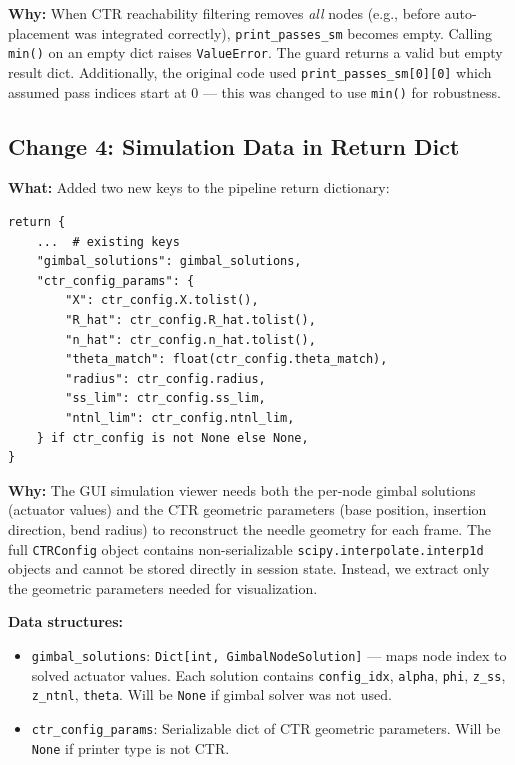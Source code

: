 \documentclass[11pt,a4paper]{article}
\begin{document}
\textbf{Why:} When CTR reachability filtering removes \emph{all} nodes (e.g., before auto-placement was integrated correctly), \texttt{print\_passes\_sm} becomes empty. Calling \texttt{min()} on an empty dict raises \texttt{ValueError}. The guard returns a valid but empty result dict. Additionally, the original code used \texttt{print\_passes\_sm[0][0]} which assumed pass indices start at 0 --- this was changed to use \texttt{min()} for robustness.

\subsection{Change 4: Simulation Data in Return Dict}

\textbf{What:} Added two new keys to the pipeline return dictionary:

\begin{lstlisting}
return {
    ...  # existing keys
    "gimbal_solutions": gimbal_solutions,
    "ctr_config_params": {
        "X": ctr_config.X.tolist(),
        "R_hat": ctr_config.R_hat.tolist(),
        "n_hat": ctr_config.n_hat.tolist(),
        "theta_match": float(ctr_config.theta_match),
        "radius": ctr_config.radius,
        "ss_lim": ctr_config.ss_lim,
        "ntnl_lim": ctr_config.ntnl_lim,
    } if ctr_config is not None else None,
}
\end{lstlisting}

\textbf{Why:} The GUI simulation viewer needs both the per-node gimbal solutions (actuator values) and the CTR geometric parameters (base position, insertion direction, bend radius) to reconstruct the needle geometry for each frame. The full \texttt{CTRConfig} object contains non-serializable \texttt{scipy.interpolate.interp1d} objects and cannot be stored directly in session state. Instead, we extract only the geometric parameters needed for visualization.

\textbf{Data structures:}
\begin{itemize}[nosep]
    \item \texttt{gimbal\_solutions}: \texttt{Dict[int, GimbalNodeSolution]} --- maps node index to solved actuator values. Each solution contains \texttt{config\_idx}, \texttt{alpha}, \texttt{phi}, \texttt{z\_ss}, \texttt{z\_ntnl}, \texttt{theta}. Will be \texttt{None} if gimbal solver was not used.
    \item \texttt{ctr\_config\_params}: Serializable dict of CTR geometric parameters. Will be \texttt{None} if printer type is not CTR.
\end{itemize}
\end{document}
